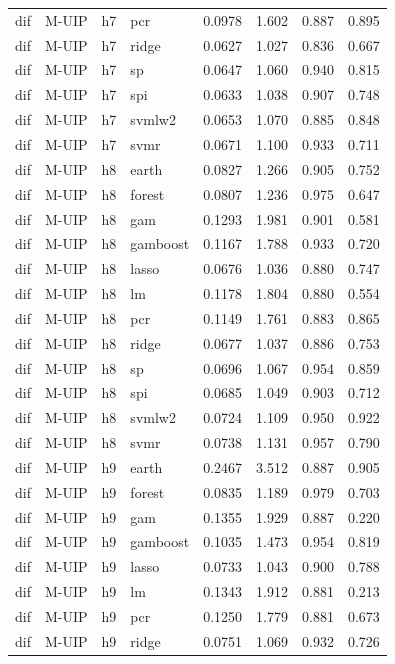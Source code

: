 \begin{ThreePartTable}
\begin{longtable}[t]{llclcccc}
dif & M-UIP & h7 & pcr & 0.0978 & 1.602 & 0.887 & 0.895\\
dif & M-UIP & h7 & ridge & 0.0627 & 1.027 & 0.836 & 0.667\\
dif & M-UIP & h7 & sp & 0.0647 & 1.060 & 0.940 & 0.815\\
dif & M-UIP & h7 & spi & 0.0633 & 1.038 & 0.907 & 0.748\\
dif & M-UIP & h7 & svmlw2 & 0.0653 & 1.070 & 0.885 & 0.848\\
dif & M-UIP & h7 & svmr & 0.0671 & 1.100 & 0.933 & 0.711\\
\addlinespace
dif & M-UIP & h8 & earth & 0.0827 & 1.266 & 0.905 & 0.752\\
dif & M-UIP & h8 & forest & 0.0807 & 1.236 & 0.975 & 0.647\\
dif & M-UIP & h8 & gam & 0.1293 & 1.981 & 0.901 & 0.581\\
dif & M-UIP & h8 & gamboost & 0.1167 & 1.788 & 0.933 & 0.720\\
dif & M-UIP & h8 & lasso & 0.0676 & 1.036 & 0.880 & 0.747\\
dif & M-UIP & h8 & lm & 0.1178 & 1.804 & 0.880 & 0.554\\
dif & M-UIP & h8 & pcr & 0.1149 & 1.761 & 0.883 & 0.865\\
dif & M-UIP & h8 & ridge & 0.0677 & 1.037 & 0.886 & 0.753\\
dif & M-UIP & h8 & sp & 0.0696 & 1.067 & 0.954 & 0.859\\
dif & M-UIP & h8 & spi & 0.0685 & 1.049 & 0.903 & 0.712\\
dif & M-UIP & h8 & svmlw2 & 0.0724 & 1.109 & 0.950 & 0.922\\
dif & M-UIP & h8 & svmr & 0.0738 & 1.131 & 0.957 & 0.790\\
\addlinespace
dif & M-UIP & h9 & earth & 0.2467 & 3.512 & 0.887 & 0.905\\
dif & M-UIP & h9 & forest & 0.0835 & 1.189 & 0.979 & 0.703\\
dif & M-UIP & h9 & gam & 0.1355 & 1.929 & 0.887 & 0.220\\
dif & M-UIP & h9 & gamboost & 0.1035 & 1.473 & 0.954 & 0.819\\
dif & M-UIP & h9 & lasso & 0.0733 & 1.043 & 0.900 & 0.788\\
dif & M-UIP & h9 & lm & 0.1343 & 1.912 & 0.881 & 0.213\\
dif & M-UIP & h9 & pcr & 0.1250 & 1.779 & 0.881 & 0.673\\
dif & M-UIP & h9 & ridge & 0.0751 & 1.069 & 0.932 & 0.726\\

\end{longtable}
\end{ThreePartTable}
